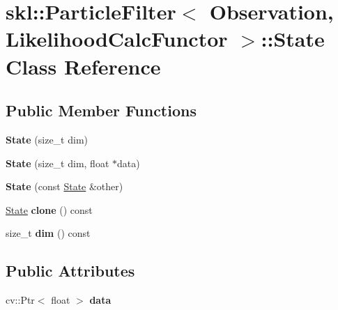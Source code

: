 \hypertarget{classskl_1_1_particle_filter_1_1_state}{}\section{skl\+:\+:Particle\+Filter$<$ Observation, Likelihood\+Calc\+Functor $>$\+:\+:State Class Reference}
\label{classskl_1_1_particle_filter_1_1_state}
\subsection*{Public Member Functions}
\begin{DoxyCompactItemize}
\item 
\hypertarget{classskl_1_1_particle_filter_1_1_state_a6ff704b75497738e21cfc10aa367a11b}{}\label{classskl_1_1_particle_filter_1_1_state_a6ff704b75497738e21cfc10aa367a11b} 
{\bfseries State} (size\+\_\+t dim)
\item 
\hypertarget{classskl_1_1_particle_filter_1_1_state_ac6edc939c6cf03c0d3ec9b058e92e151}{}\label{classskl_1_1_particle_filter_1_1_state_ac6edc939c6cf03c0d3ec9b058e92e151} 
{\bfseries State} (size\+\_\+t dim, float $\ast$data)
\item 
\hypertarget{classskl_1_1_particle_filter_1_1_state_a7c1cc84a4a62cd5196374628e1d38cc1}{}\label{classskl_1_1_particle_filter_1_1_state_a7c1cc84a4a62cd5196374628e1d38cc1} 
{\bfseries State} (const \hyperlink{classskl_1_1_particle_filter_1_1_state}{State} \&other)
\item 
\hypertarget{classskl_1_1_particle_filter_1_1_state_a104052be4ddae96d6bf5d3800cc85120}{}\label{classskl_1_1_particle_filter_1_1_state_a104052be4ddae96d6bf5d3800cc85120} 
\hyperlink{classskl_1_1_particle_filter_1_1_state}{State} {\bfseries clone} () const
\item 
\hypertarget{classskl_1_1_particle_filter_1_1_state_a90c79606220afc69f15c2d4db6567e2b}{}\label{classskl_1_1_particle_filter_1_1_state_a90c79606220afc69f15c2d4db6567e2b} 
size\+\_\+t {\bfseries dim} () const
\end{DoxyCompactItemize}
\subsection*{Public Attributes}
\begin{DoxyCompactItemize}
\item 
\hypertarget{classskl_1_1_particle_filter_1_1_state_aaee6a1cb6e79d44ce7afc6506adfd393}{}\label{classskl_1_1_particle_filter_1_1_state_aaee6a1cb6e79d44ce7afc6506adfd393} 
cv\+::\+Ptr$<$ float $>$ {\bfseries data}
\end{DoxyCompactItemize}
